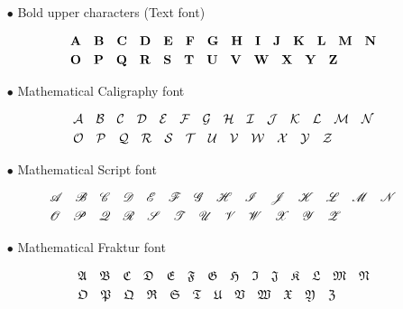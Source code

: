 \begin{itemize}
\item[$\bullet$] Bold upper characters (Text font)

\begin{equation*}
	\begin{aligned}
		&\mathbf{A} \quad	
		\mathbf{B} \quad
		\mathbf{C} \quad
		\mathbf{D} \quad
		\mathbf{E} \quad
		\mathbf{F} \quad
		\mathbf{G} \quad
		\mathbf{H} \quad
		\mathbf{I} \quad
		\mathbf{J} \quad
		\mathbf{K} \quad
		\mathbf{L} \quad
		\mathbf{M} \quad
		\mathbf{N} 
		\\
		&\mathbf{O} \quad
		\mathbf{P} \quad
		\mathbf{Q} \quad
		\mathbf{R} \quad
		\mathbf{S} \quad
		\mathbf{T} \quad
		\mathbf{U} \quad
		\mathbf{V} \quad
		\mathbf{W} \quad
		\mathbf{X} \quad
		\mathbf{Y} \quad
		\mathbf{Z}
	\end{aligned}
\end{equation*}

\item[$\bullet$] Mathematical Caligraphy font

\begin{equation*}
	\begin{aligned}
		&\mathcal{A} \quad	
		\mathcal{B} \quad
		\mathcal{C} \quad
		\mathcal{D} \quad
		\mathcal{E} \quad
		\mathcal{F} \quad
		\mathcal{G} \quad
		\mathcal{H} \quad
		\mathcal{I} \quad
		\mathcal{J} \quad
		\mathcal{K} \quad
		\mathcal{L} \quad
		\mathcal{M} \quad
		\mathcal{N} 
		\\
		&\mathcal{O} \quad
		\mathcal{P} \quad
		\mathcal{Q} \quad
		\mathcal{R} \quad
		\mathcal{S} \quad
		\mathcal{T} \quad
		\mathcal{U} \quad
		\mathcal{V} \quad
		\mathcal{W} \quad
		\mathcal{X} \quad
		\mathcal{Y} \quad
		\mathcal{Z}
	\end{aligned}
\end{equation*}

\item[$\bullet$] Mathematical Script font 

\begin{equation*}
	\begin{aligned}
		&\mathscr{A} \quad	
		\mathscr{B} \quad
		\mathscr{C} \quad
		\mathscr{D} \quad
		\mathscr{E} \quad
		\mathscr{F} \quad
		\mathscr{G} \quad
		\mathscr{H} \quad
		\mathscr{I} \quad
		\mathscr{J} \quad
		\mathscr{K} \quad
		\mathscr{L} \quad
		\mathscr{M} \quad
		\mathscr{N} 
		\\
		&\mathscr{O} \quad
		\mathscr{P} \quad
		\mathscr{Q} \quad
		\mathscr{R} \quad
		\mathscr{S} \quad
		\mathscr{T} \quad
		\mathscr{U} \quad
		\mathscr{V} \quad
		\mathscr{W} \quad
		\mathscr{X} \quad
		\mathscr{Y} \quad
		\mathscr{Z}
	\end{aligned}
\end{equation*}

\item[$\bullet$] Mathematical Fraktur font 

\begin{equation*}
	\begin{aligned}
		&\mathfrak{A} \quad	
		\mathfrak{B} \quad
		\mathfrak{C} \quad
		\mathfrak{D} \quad
		\mathfrak{E} \quad
		\mathfrak{F} \quad
		\mathfrak{G} \quad
		\mathfrak{H} \quad
		\mathfrak{I} \quad
		\mathfrak{J} \quad
		\mathfrak{K} \quad
		\mathfrak{L} \quad
		\mathfrak{M} \quad
		\mathfrak{N} 
		\\
		&\mathfrak{O} \quad
		\mathfrak{P} \quad
		\mathfrak{Q} \quad
		\mathfrak{R} \quad
		\mathfrak{S} \quad
		\mathfrak{T} \quad
		\mathfrak{U} \quad
		\mathfrak{V} \quad
		\mathfrak{W} \quad
		\mathfrak{X} \quad
		\mathfrak{Y} \quad
		\mathfrak{Z}
	\end{aligned}
\end{equation*}


\end{itemize}
